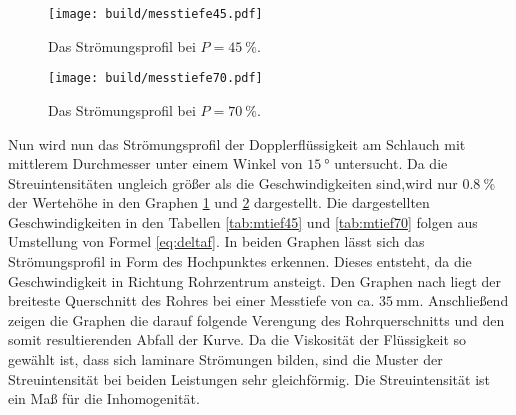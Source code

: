 \begin{figure}
 \centering
 \caption{Das Strömungsprofil bei $P = \SI{45}{\percent}$.}
 \texttt{[image: build/messtiefe45.pdf]}
 \label{fig:P45}
\end{figure}

\begin{figure}
 \centering
 \caption{Das Strömungsprofil bei $P = \SI{70}{\percent}$.}
 \texttt{[image: build/messtiefe70.pdf]}
 \label{fig:P70}
\end{figure}



Nun wird nun das Strömungsprofil der Dopplerflüssigkeit am Schlauch mit mittlerem
Durchmesser unter einem Winkel von $\SI{15}{\degree}$ untersucht. Da die Streuintensitäten ungleich größer als die Geschwindigkeiten
sind,wird nur $\SI{0.8}{\percent}$ der Wertehöhe in den Graphen \ref{fig:P45} und \ref{fig:P70} dargestellt. Die
dargestellten Geschwindigkeiten in den Tabellen \ref{tab:mtief45} und \ref{tab:mtief70} folgen aus Umstellung von Formel \ref{eq:deltaf}.
 In beiden Graphen lässt sich das Strömungsprofil in Form des Hochpunktes erkennen. Dieses
 entsteht, da die Geschwindigkeit in Richtung Rohrzentrum ansteigt. Den Graphen nach liegt
 der breiteste Querschnitt des Rohres bei einer Messtiefe von ca. $\SI{35}{\milli\meter}$.
 Anschließend zeigen die Graphen die darauf folgende Verengung des Rohrquerschnitts
 und den somit resultierenden Abfall der Kurve. Da die Viskosität der Flüssigkeit so
 gewählt ist, dass sich laminare Strömungen bilden, sind die Muster der Streuintensität
 bei beiden Leistungen sehr gleichförmig. Die Streuintensität ist ein Maß für
 die Inhomogenität.
